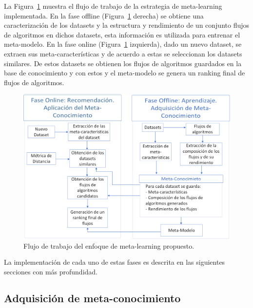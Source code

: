 La Figura~\ref{fig:system} muestra el flujo de trabajo de la estrategia de meta-learning implementada. En la fase offline (Figura~\ref{fig:system} derecha) se obtiene una caracterización de los datasets y la estructura y rendimiento de un conjunto flujos de algoritmos en dichos datasets, esta información es utilizada para entrenar el meta-modelo. En la fase online (Figura~\ref{fig:system} izquierda), dado un nuevo dataset, se extraen sus meta-características y de acuerdo a estas se seleccionan los datasets similares. De estos datasets se obtienen los flujos de algoritmos guardados en la base de conocimiento y con estos y el meta-modelo se genera un ranking final de flujos de algoritmos.


\begin{figure}[H]
	\centering
	\includegraphics[scale=.4]{Figures/system.png}
	\caption{Flujo de trabajo del enfoque de meta-learning propuesto.}
	\label{fig:system}
\end{figure}

La implementación de cada uno de estas fases es descrita en las siguientes secciones con más profundidad.

\subsection{Adquisición de meta-conocimiento}\label{sub:adquisicion}

